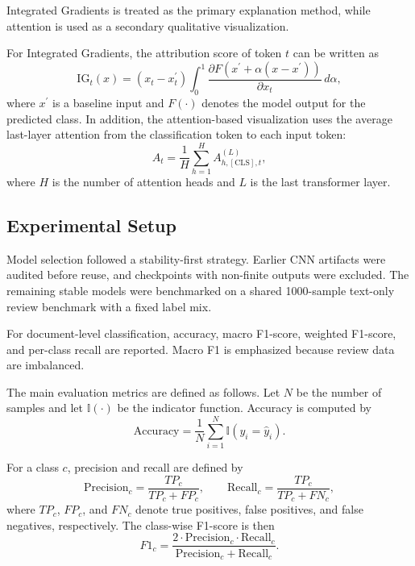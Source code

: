 \documentclass[a4paper,12pt]{extarticle}
\begin{document}
Integrated Gradients is treated as the primary explanation method, while attention is used as a secondary qualitative visualization.


For Integrated Gradients, the attribution score of token $t$ can be written as
\begin{equation}
\mathrm{IG}_t(x) = \left(x_t - x_t^{\prime}\right) \int_{0}^{1}
\frac{\partial F\left(x^{\prime} + \alpha \left(x - x^{\prime}\right)\right)}
{\partial x_t}\, d\alpha,
\end{equation}
where $x^{\prime}$ is a baseline input and $F(\cdot)$ denotes the model output for the predicted class.
 In addition, the attention-based visualization uses the average last-layer attention from the classification token to each input token:
\begin{equation}
A_t = \frac{1}{H} \sum_{h=1}^{H} A^{(L)}_{h,\mathrm{[CLS]},t},
\end{equation}
where $H$ is the number of attention heads and $L$ is the last transformer layer.

\subsection{Experimental Setup}


Model selection followed a stability-first strategy. Earlier CNN artifacts were audited before reuse, and checkpoints with non-finite outputs were excluded. The remaining stable models were benchmarked on a shared 1000-sample text-only review benchmark with a fixed label mix.


For document-level classification, accuracy, macro F1-score, weighted F1-score, and per-class recall are reported. Macro F1 is emphasized because review data are imbalanced.

The main evaluation metrics are defined as follows. Let $N$ be the number of samples and let $\mathbb{I}(\cdot)$ be the indicator function. Accuracy is computed by
\begin{equation}
\mathrm{Accuracy} = \frac{1}{N} \sum_{i=1}^{N} \mathbb{I}(y_i = \hat{y}_i).
\end{equation}

For a class $c$, precision and recall are defined by
\begin{equation}
\mathrm{Precision}_c = \frac{TP_c}{TP_c + FP_c}, \qquad
\mathrm{Recall}_c = \frac{TP_c}{TP_c + FN_c},
\end{equation}
where $TP_c$, $FP_c$, and $FN_c$ denote true positives, false positives, and false negatives, respectively. The class-wise F1-score is then
\begin{equation}
F1_c = \frac{2 \cdot \mathrm{Precision}_c \cdot \mathrm{Recall}_c}
{\mathrm{Precision}_c + \mathrm{Recall}_c}.
\end{equation}
\end{document}
